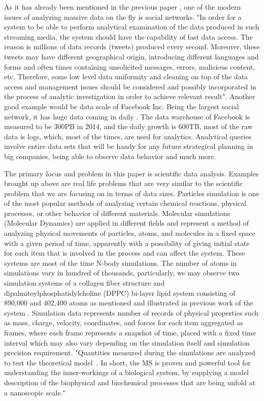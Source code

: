 \documentclass[12pt,letterpaper]{report}
\begin{document}
As it has already been mentioned in the previous paper \cite{mainPaper}, one of the modern issues of analyzing massive data on the fly is social networks. "In order for a system to be able to perform analytical examination of the data produced in such streaming media, the system should have the capability of fast data access. The reason is millions of data records (tweets) produced every second. Moreover, these tweets may have different geographical origin, introducing different languages and forms and often times containing unsolicited messages, errors,
malicious content, etc. Therefore, some low level data uniformity
and cleaning on top of the data access and management issues should
be considered and possibly incorporated in the process of analytic
investigation in order to achieve relevant result".\cite{mainPaper, nature_bigdata08,nature_bigdata12,science_social10,jcs_twitter11} Another good example would be data scale of Facebook Inc. Being the largest social network, it has huge data coming in daily \cite{fbStats}. The data warehouse of Facebook is measured to be 300PB in 2014, and the daily growth is 600TB, most of the raw data is logs, which, most of the times, are used for analytics. Analytical queries involve entire data sets that will be handy for any future strategical planning in big companies, being able to observe data behavior and much more.

The primary focus and problem in this paper is scientific data analysis. Examples brought up above are real life problems that are very similar to the scientific problem that we are focusing on in terms of data sizes. Particles simulation is one of the most popular methods of analyzing certain chemical reactions, physical processes, or other behavior of different materials.
Molecular simulations (Molecular Dynamics) are applied in different fields and represent a method of analyzing physical movements of particles, atoms, and molecules in a fixed space with a given period of time, apparently with a possibility of giving initial state for each item that is involved in the process and can affect the system. These systems are most of the time N-body simulations. The number of atoms in simulations vary in hundred of thousands, particularly, we may observe two simulation systems of a collagen fiber structure and dipalmitoylphosphatidylcholine (DPPC) bi-layer lipid system consisting of 890,000 and 402,400 atoms as mentioned and illustrated in previous work of the system \cite{mainPaper}. Simulation data represents number of records of physical properties such as mass, charge, velocity, coordinates, and forces for each item aggregated as frames, where each frame represents a snapshot of time, placed with a fixed time interval which may also vary depending on the simulation itself and simulation precision requirement. "Quantities measured during the simulations are analyzed to test the theoretical
model~\cite{Frenkel:api01,Landau:cup05}. In short, the MS is proven
and powerful tool for understanding the inner-workings of a
biological system, by supplying a model description of the
biophysical and biochemical processes that are being unfold at a
nanoscopic scale." \cite{mainPaper}
\end{document}
